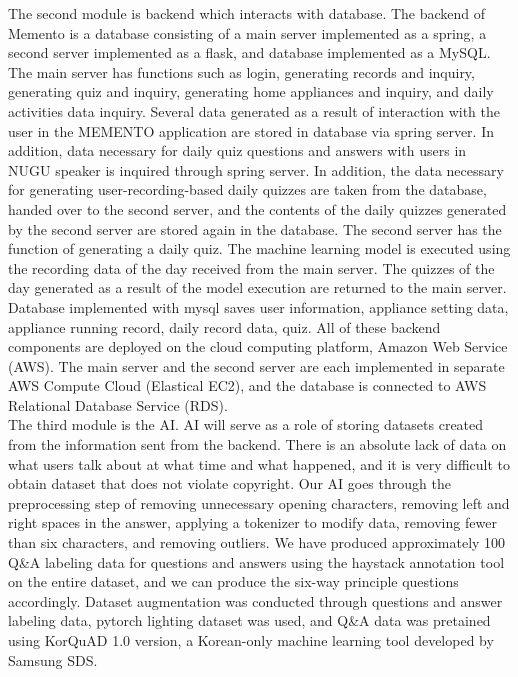 \documentclass[conference]{IEEEtran}
\begin{document}
\indent The second module is backend which interacts with database. The backend of Memento is a database consisting of a main server implemented as a spring, a second server implemented as a flask, and database implemented as a MySQL. The main server has functions such as login, generating records and inquiry, generating quiz and inquiry, generating home appliances and inquiry, and daily activities data inquiry. Several data generated as a result of interaction with the user in the MEMENTO application are stored in database via spring server. In addition, data necessary for daily quiz questions and answers with users in NUGU speaker is inquired through spring server. In addition, the data necessary for generating user-recording-based daily quizzes are taken from the database, handed over to the second server, and the contents of the daily quizzes generated by the second server are stored again in the database. The second server has the function of generating a daily quiz. The machine learning model is executed using the recording data of the day received from the main server. The quizzes of the day generated as a result of the model execution are returned to the main server. Database implemented with mysql saves user information, appliance setting data, appliance running record, daily record data, quiz. All of these backend components are deployed on the cloud computing platform, Amazon Web Service (AWS). The main server and the second server are each implemented in separate AWS Compute Cloud (Elastical EC2), and the database is connected to AWS Relational Database Service (RDS).\\

\indent The third module is the AI. AI will serve as a role of storing datasets created from the information sent from the backend. There is an absolute lack of data on what users talk about at what time and what happened, and it is very difficult to obtain dataset that does not violate copyright. Our AI goes through the preprocessing step of removing unnecessary opening characters, removing left and right spaces in the answer, applying a tokenizer to modify data, removing fewer than six characters, and removing outliers. We have produced approximately 100 Q\&A labeling data for questions and answers using the haystack annotation tool on the entire dataset, and we can produce the six-way principle questions accordingly. Dataset augmentation was conducted through questions and answer labeling data, pytorch lighting dataset was used, and Q\&A data was pretained using KorQuAD 1.0 version, a Korean-only machine learning tool developed by Samsung SDS.\\
\end{document}
